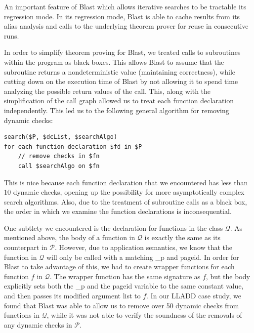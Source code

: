 \documentclass[10pt,letterpaper,twocolumn,english]{article}
\newcommand{\fP}{{$\mathcal P$}\xspace}
\newcommand{\fQ}{{$\mathcal Q$}\xspace}
\begin{document}
An important feature of Blast which allows iterative searches to
be tractable its regression mode.  In its regression mode, Blast is able
to cache results from its alias analysis and calls to the underlying
theorem prover for reuse in consecutive runs.

In order to simplify theorem proving for Blast, we treated calls to
subroutines within the program as black boxes.  This allows Blast to
assume that the subroutine returns a nondeterministic value
(maintaining correctness), while cutting down on the execution time of
Blast by not allowing it to spend time analyzing the possible return
values of the call.  This, along with the simplification of the call
graph allowed us to treat each function declaration independently.  This
led us to the following general algorithm for removing dynamic checks:

\begin{verbatim}
search($P, $dcList, $searchAlgo)
for each function declaration $fd in $P
    // remove checks in $fn
    call $searchAlgo on $fn 
\end{verbatim}

This is nice because each function declaration that we encountered has
less than 10 dynamic checks, opening up the possibility for more
asymptotically complex search algorithms.  Also, due to the treatment of
subroutine calls as a black box, the order in which we examine the
function declarations is inconsequential.

One subtlety we encountered is the declaration for functions in the
class \fQ.  As mentioned above, the body of a function in \fQ is exactly
the same as its counterpart in \fP.  However, due to application
semantics, we know that the function in \fQ will only be called with a
matching \_p and pageid.  In order for Blast to take advantage of this,
we had to create wrapper functions for each function $f$ in \fQ.  The
wrapper function has the same signature as $f$, but the body explicitly
sets both the \_p and the pageid variable to the same constant value,
and then passes its modified argument list to $f$.  In our LLADD case
study, we found that Blast was able to allow us to remove over 50
dynamic checks from functions in \fQ, while it was not able to verify
the soundness of the removals of any dynamic checks in \fP.
\end{document}
